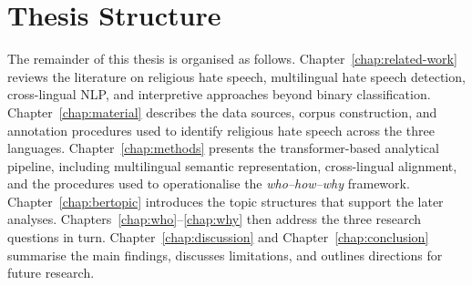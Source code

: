 \documentclass[../CLthesis.tex]{subfiles}
\begin{document}
\section{Thesis Structure}

The remainder of this thesis is organised as follows. Chapter~\ref{chap:related-work} reviews the literature on religious hate speech, multilingual hate speech detection, cross-lingual NLP, and interpretive approaches beyond binary classification. Chapter~\ref{chap:material} describes the data sources, corpus construction, and annotation procedures used to identify religious hate speech across the three languages. Chapter~\ref{chap:methods} presents the transformer-based analytical pipeline, including multilingual semantic representation, cross-lingual alignment, and the procedures used to operationalise the \emph{who--how--why} framework. Chapter~\ref{chap:bertopic} introduces the topic structures that support the later analyses. Chapters~\ref{chap:who}--\ref{chap:why} then address the three research questions in turn. Chapter~\ref{chap:discussion} and Chapter~\ref{chap:conclusion} summarise the main findings, discusses limitations, and outlines directions for future research.

\subfilebibliography
\end{document}
